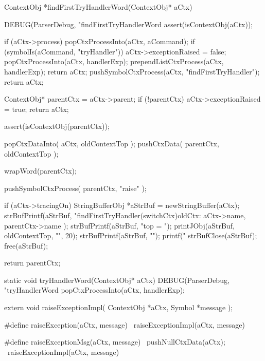 \startCCode
ContextObj *findFirstTryHandlerWord(ContextObj* aCtx) {
  DEBUG(ParserDebug, "findFirstTryHandlerWord%
  assert(isContextObj(aCtx));

  if (aCtx->process) {
    popCtxProcessInto(aCtx, aCommand);
    if (symbolIs(aCommand, "tryHandler")) {
      aCtx->exceptionRaised = false;
      popCtxProcessInto(aCtx, handlerExp);
      prependListCtxProcess(aCtx, handlerExp);
      return aCtx;
    }
    pushSymbolCtxProcess(aCtx, "findFirstTryHandler");
    return aCtx;
  }

  ContextObj* parentCtx = aCtx->parent;
  if (!parentCtx) {
    aCtx->exceptionRaised = true;
    return aCtx;
  }

  assert(isContextObj(parentCtx));
  
  popCtxDataInto(   aCtx,      oldContextTop );
  pushCtxData(      parentCtx, oldContextTop );
  
  wrapWord(parentCtx);
  
  pushSymbolCtxProcess( parentCtx, "raise"       );

  if (aCtx->tracingOn) {
    StringBufferObj *aStrBuf = newStringBuffer(aCtx);
    strBufPrintf(aStrBuf,
      "findFirstTryHandler(switchCtx)\n oldCtx: %
      aCtx->name, parentCtx->name
    );
    strBufPrintf(aStrBuf, "top = ");
    printJObj(aStrBuf, oldContextTop, "", 20);
    strBufPrintf(aStrBuf, "\n");
    printf("%
    strBufClose(aStrBuf);
    free(aStrBuf);
  }

  return parentCtx;
}
\stopCCode

\startCCode
static void tryHandlerWord(ContextObj* aCtx) {
  DEBUG(ParserDebug, "tryHandlerWord%
  popCtxProcessInto(aCtx, handlerExp);
}
\stopCCode

\startCHeader
extern void raiseExceptionImpl(
  ContextObj *aCtx,
  Symbol     *message
);

#define raiseException(aCtx, message) \
  raiseExceptionImpl(aCtx, message)

#define raiseExceptionMsg(aCtx, message)  \
  pushNullCtxData(aCtx);                  \
  raiseExceptionImpl(aCtx, message)
\stopCHeader


